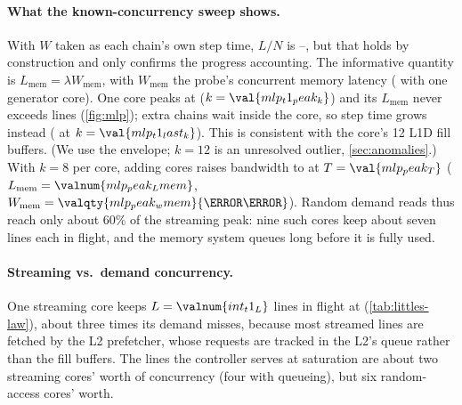 \paragraph{What the known-concurrency sweep shows.} With $W$ taken as each chain's own step time,
$L/N$ is --, but that holds by construction and only confirms the progress
accounting. The informative quantity is $L_{\text{mem}} = \lambda W_{\text{mem}}$, with $W_{\text{mem}}$
the probe's concurrent memory latency ( with one generator core). One core
peaks at  ($k=\val{mlp_t1_peak_k}$) and its $L_{\text{mem}}$
never exceeds  lines (\cref{fig:mlp}); extra chains wait inside the core, so step
time grows instead ( at $k=\val{mlp_t1_last_k}$). This is consistent with
the core's 12 L1D fill buffers. (We use the envelope; $k=12$ is an unresolved outlier, \cref{sec:anomalies}.)
With $k=8$ per core, adding cores raises bandwidth to  at $T=\val{mlp_peak_T}$
($L_{\text{mem}}=\valnum{mlp_peak_Lmem}$, $W_{\text{mem}}=\valqty{mlp_peak_wmem}{\nano\second}$). Random demand
reads thus reach only about 60\% of the streaming peak: nine such cores keep about seven lines each in
flight, and the memory system queues long before it is fully used.

\paragraph{Streaming vs.\ demand concurrency.} One streaming core keeps $L=\valnum{int_t1_L}$ lines in
flight at  (\cref{tab:littles-law}), about three times its
 demand misses, because most streamed lines are fetched by the L2 prefetcher, whose
requests are tracked in the L2's queue rather than the fill buffers. The  lines the controller serves at saturation are about two streaming cores'
worth of concurrency (four with queueing), but six random-access cores' worth.
